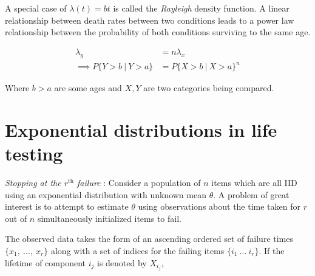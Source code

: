 A special case of $ \lambda(t) = bt $ is called the \textit{Rayleigh} density function. A linear relationship between death rates between two conditions leads to a power law relationship between the probability of both conditions surviving to the same age.

\begin{align}
	\lambda_y &= n\lambda_x \nonumber \nonumber\\
	\implies P\{ Y > b\ |\ Y > a \} &= P\{ X > b\ |\ X > a \}^{n} 
\end{align}

Where $ b > a $ are some ages and $ X, Y $ are two categories being compared.

\section{Exponential distributions in life testing}

\textit{Stopping at the $ r^{\text{th}} $ failure} : Consider a population of $ n $ items which are all IID using an exponential distribution with unknown mean $ \theta $. A problem of great interest is to attempt to estimate $ \theta $ using observations about the time taken for $ r $ out of $ n $ simultaneously initialized items to fail.

The observed data takes the form of an ascending ordered set of failure times $ \{ x_1,\ \dots,\ x_r \} $ along with a set of indices for the failing items $\{ i_1\ \dots \ i_r \}$. If the lifetime of component $i_j$ is denoted by $X_{i_{j}}$, 
